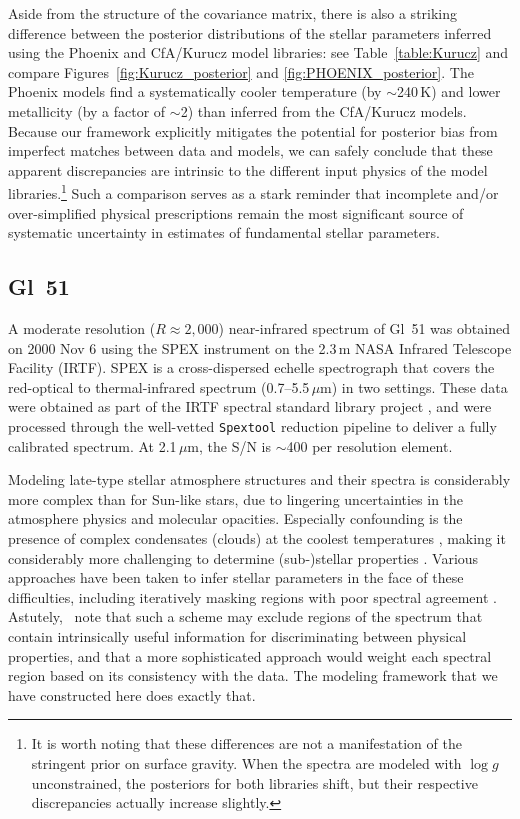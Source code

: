 \documentclass[iop,floatfix]{emulateapj}
\begin{document}
Aside from the structure of the covariance matrix, there is also a striking difference between the 
posterior distributions of the stellar parameters inferred using the {\sc Phoenix} and {\sc 
CfA/Kurucz} model libraries: see Table~\ref{table:Kurucz} and compare 
Figures~\ref{fig:Kurucz_posterior} and \ref{fig:PHOENIX_posterior}.  The {\sc Phoenix} models find 
a systematically cooler temperature (by $\sim$240\,K) and lower metallicity (by a factor of 
$\sim$2) than inferred from the {\sc CfA/Kurucz} models.  Because our framework explicitly 
mitigates the potential for posterior bias from imperfect matches between data and models, we can 
safely conclude that these apparent discrepancies are intrinsic to the different input physics of 
the model libraries.\footnote{It is worth noting that these differences are not a manifestation of 
the stringent prior on surface gravity.  When the spectra are modeled with $\log g$ unconstrained, 
the posteriors for both libraries shift, but their respective discrepancies actually increase 
slightly.}  Such a comparison serves as a stark reminder that incomplete and/or over-simplified 
physical prescriptions remain the most significant source of systematic uncertainty in estimates 
of fundamental stellar parameters.


\subsection{Gl~51}

A moderate resolution ($R\approx2,000$) near-infrared spectrum of Gl~51 was obtained on 2000 
Nov 6 using the SPEX instrument \citep{rayner03} on the 2.3\,m NASA Infrared Telescope Facility 
(IRTF).  SPEX is a cross-dispersed echelle spectrograph that covers the red-optical to 
thermal-infrared spectrum (0.7--5.5\,$\mu$m) in two settings.  These data were obtained as part of 
the IRTF spectral standard library project \citep{cushing05,rayner09}, and were processed through 
the well-vetted {\tt Spextool} reduction pipeline \citep{cushing04,vacca03} to deliver a fully 
calibrated spectrum.  At 2.1\,$\mu$m, the S/N is $\sim$400 per resolution element.

Modeling late-type stellar atmosphere structures and their spectra is considerably more complex 
than for Sun-like stars, due to lingering uncertainties in the atmosphere physics and molecular 
opacities.  Especially confounding is the presence of complex condensates (clouds) at the coolest 
temperatures \citep{allard13}, making it considerably more challenging to determine (sub-)stellar 
properties \citep{rajpurohit14}.  Various approaches have been taken to infer stellar parameters in 
the face of these difficulties, including iteratively masking regions with poor spectral agreement 
\citep[e.g.,][]{mann13}.  Astutely, \citeauthor{mann13}~note that such a scheme may exclude 
regions of the spectrum that contain intrinsically useful information for discriminating between 
physical properties, and that a more sophisticated approach would weight each spectral region based 
on its consistency with the data.  The modeling framework that we have constructed here does 
exactly that.
\end{document}
